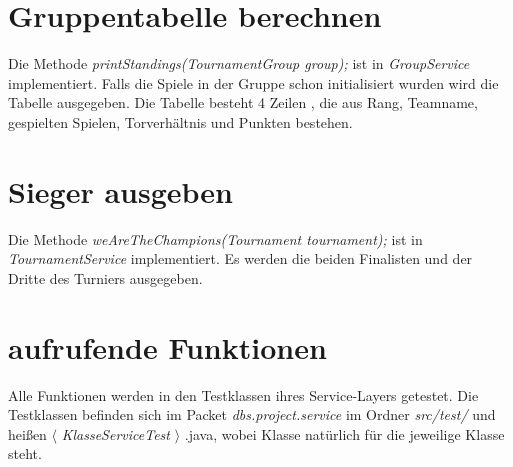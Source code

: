 \documentclass[11pt,german]{scrartcl}
\begin{document}
\section{Gruppentabelle berechnen}
Die Methode {\it printStandings(TournamentGroup group);} ist in {\it GroupService} implementiert. Falls die Spiele in der Gruppe schon initialisiert wurden wird die Tabelle ausgegeben. Die Tabelle besteht 4 Zeilen , die aus Rang, Teamname, gespielten Spielen, Torverhältnis und Punkten bestehen. 

\section{Sieger ausgeben}
Die Methode {\it weAreTheChampions(Tournament tournament);} ist in {\it TournamentService} implementiert. Es werden die beiden Finalisten und der Dritte des Turniers ausgegeben.

\section{aufrufende Funktionen}
Alle Funktionen werden in den Testklassen ihres Service-Layers getestet. Die Testklassen befinden sich im Packet {\it dbs.project.service} im Ordner {\it src/test/} und heißen $\langle$ {\it KlasseServiceTest} $\rangle$ .java, wobei Klasse natürlich für die jeweilige Klasse steht.

%
\end{document}
